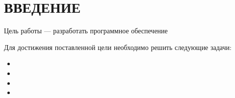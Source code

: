 \chapter*{ВВЕДЕНИЕ}

Цель работы --- разработать программное обеспечение

Для достижения поставленной цели необходимо решить следующие задачи:
\begin{itemize}[left=\parindent]
    \item
    \item
    \item
    \item
\end{itemize}

